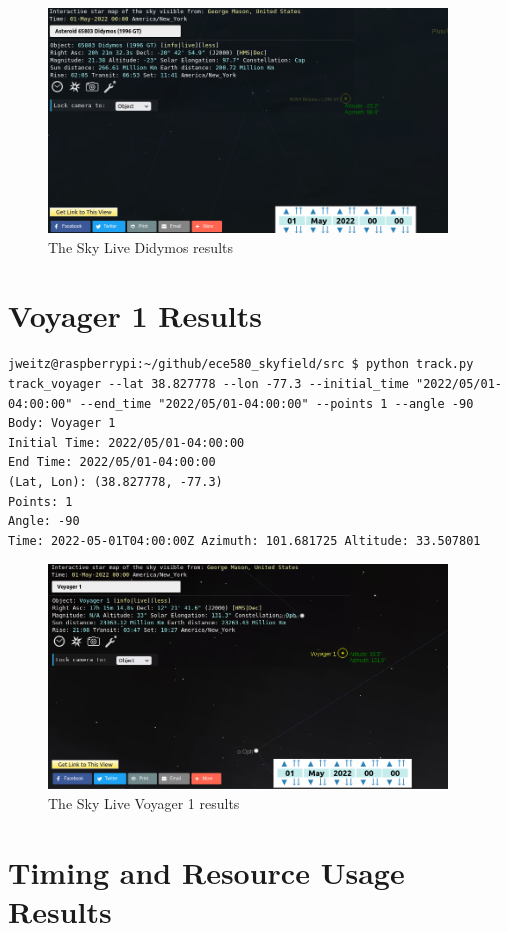 \documentclass[../main.tex]{subfiles}
\begin{document}
\begin{figure}[H]
    \centering
    \includegraphics[width=300pt]{components/photos/didymos_crop.png}
    \caption{The Sky Live Didymos results}
    \label{fig:skylive_didymos}
\end{figure}


\section{Voyager 1 Results}

\begin{lstlisting}
jweitz@raspberrypi:~/github/ece580_skyfield/src $ python track.py track_voyager --lat 38.827778 --lon -77.3 --initial_time "2022/05/01-04:00:00" --end_time "2022/05/01-04:00:00" --points 1 --angle -90
Body: Voyager 1
Initial Time: 2022/05/01-04:00:00
End Time: 2022/05/01-04:00:00
(Lat, Lon): (38.827778, -77.3)
Points: 1
Angle: -90
Time: 2022-05-01T04:00:00Z Azimuth: 101.681725 Altitude: 33.507801
\end{lstlisting}

\begin{figure}[H]
    \centering
    \includegraphics[width=300pt]{components/photos/voyager1_crop.png}
    \caption{The Sky Live Voyager 1 results}
    \label{fig:skylive_voyager}
\end{figure}

\section{Timing and Resource Usage Results}
\end{document}
